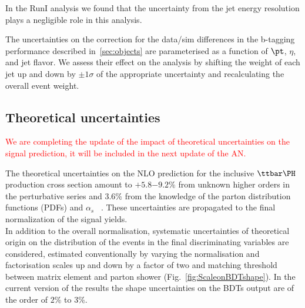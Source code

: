 In the RunI analysis we found that the uncertainty from the jet energy resolution plays a
negligible role in this analysis.


The uncertainties on the correction for the data/sim differences in the b-tagging
performance described in~\ref{sec:objects}  are
parameterised as a function of $\pt$, $\eta$, and jet flavor. We assess their effect on the analysis by shifting the weight of
each jet up and down by $\pm1\sigma$ of the appropriate uncertainty
and recalculating the overall event weight. 


\subsection{Theoretical uncertainties}

\textcolor{red}{We are completing the update of the impact of theoretical uncertainties on the signal prediction, it will be included in the next update of the AN.}

The theoretical uncertainties on the NLO prediction for the inclusive $\ttH$ production cross section
amount to $+5.8$$-9.2\%$ from unknown higher orders in the perturbative series and $3.6\%$ from the knowledge
of the parton distribution functions (PDFs) and $\alpha_{s}$ ~\cite{YR4}. These uncertainties are propagated to the
final normalization of the signal yields. \\
In addition to the overall normalisation, systematic uncertainties of theoretical origin on the
distribution of the events in the final discriminating variables are considered, estimated
conventionally by varying the normalisation and factorisation scales up and down by a factor of two and
matching threshold between matrix element and parton shower (Fig.~\ref{fig:ScaleonBDTshape}).
In the current version of the results the shape uncertainties on the BDTs output are of the order of $2\%$ to $3\%$.

